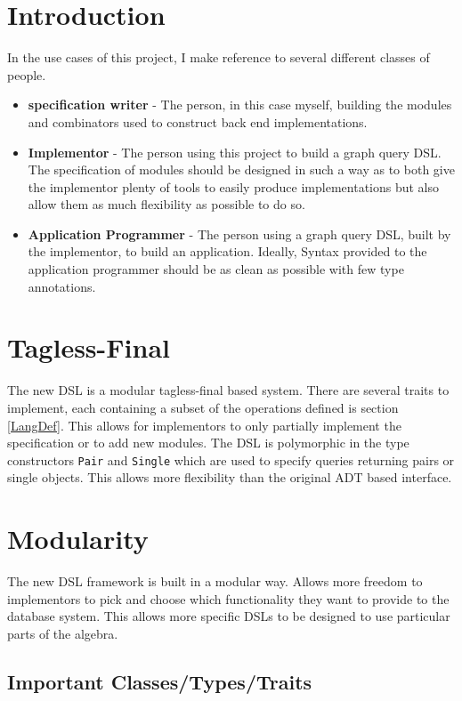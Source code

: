 \documentclass{report}
\newcommand \2[0]{\textbf{2}}
\newcommand \3[0]{\textbf{3}}
\begin{document}
\section{Introduction}
In the use cases of this project, I make reference to several different classes of people.

\begin{itemize}
    \item \textbf{specification writer} - The person, in this case myself, building the modules and combinators used to construct back end implementations.
    \item \textbf{Implementor} - The person using this project to build a graph query DSL. The specification of modules should be designed in such a way as to both give the implementor plenty of tools to easily produce implementations but also allow them as much flexibility as possible to do so.
    \item \textbf{Application Programmer} - The person using a graph query DSL, built by the implementor, to build an application. Ideally, Syntax provided to the application programmer should be as clean as possible with few type annotations.

\end{itemize}
 
\section{Tagless-Final}
The new DSL is a modular tagless-final based system. There are several traits to implement, each containing a subset of the operations defined is section \ref{LangDef}. This allows for implementors to only partially implement the specification or to add new modules.
The DSL is polymorphic in the type constructors \texttt{Pair} and \texttt{Single} which are used to specify queries returning pairs or single objects. This allows more flexibility than the original ADT based interface.

\section{Modularity}
The new DSL framework is built in a modular way. 
Allows more freedom to implementors to pick and choose which functionality they want to provide to the database system. This allows more specific DSLs to be designed to use particular parts of the algebra.
\subsection{Important Classes/Types/Traits}
\end{document}
